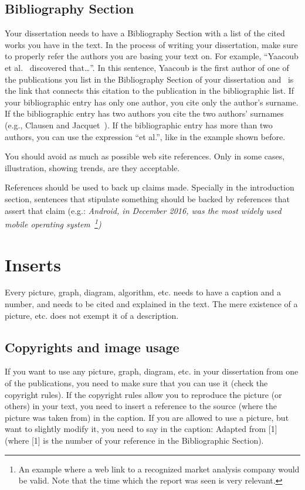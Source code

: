 \subsection{Bibliography Section}
Your dissertation needs to have a Bibliography Section with a list of the cited works you have in
the text. In the process of writing your dissertation, make sure to properly refer the authors you are
basing your text on. For example, “Yaacoub et al.~\cite{yaacoub2012} discovered that\ldots”. In this sentence, Yaacoub is the
first author of one of the publications you list in the Bibliography Section of your dissertation and~\cite{yaacoub2012} is the link that connects this citation to the publication in the bibliographic list. If your
bibliographic entry has only one author, you cite only the author's surname. If the bibliographic
entry has two authors you cite the two authors' surnames (e.g., Clausen and Jacquet~\cite{Clausen2003}). If the
bibliographic entry has more than two authors, you can use the expression “et al.”, like in the
example shown before.

You should avoid as much as possible web site references. Only in some cases, illustration, showing trends, are they acceptable.

References should be used to back up claims made. Specially in the introduction section, sentences that stipulate something should be backed by references that assert that claim (e.g.: \emph{Android, in December 2016, was the most widely used mobile operating system~\cite{netMarketShareMobileOS}\footnote{An example where a web link to a recognized market analysis company would be valid. Note that the time which the report was seen is very relevant.})}

\section{Inserts}
Every picture, graph, diagram, algorithm, etc. needs to have a caption and a number, and needs to
be cited and explained in the text. The mere existence of a picture, etc. does not exempt it of a description. 

\subsection{Copyrights and image usage}
If you want to use any picture, graph, diagram, etc. in your
dissertation from one of the publications, you need to make sure that you can use it (check the copyright rules). If the copyright
rules allow you to reproduce the picture (or others) in your text, you need to insert a reference to the
source (where the picture was taken from) in the caption. If you are allowed to use a picture, but
want to slightly modify it, you need to say in the caption: Adapted from [1] (where [1] is the
number of your reference in the Bibliographic Section).


